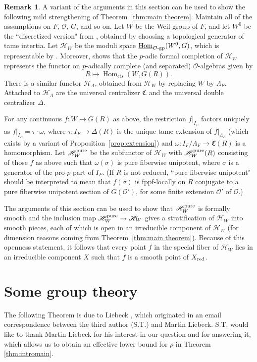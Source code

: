 \documentclass[11pt, letterpaper,english]{amsart}
\theoremstyle{plain}
\theoremstyle{definition}
\newtheorem{remark}[lem]{Remark}
\numberwithin{equation}{section}
\numberwithin{lem}{section}
\newcommand{\fC}{\mathfrak{C}}
\newcommand{\cO}{\mathcal{O}}
\newcommand{\sH}{{\mathscr H}}
\DeclareMathOperator{\Hom}{Hom}
\begin{document}
\begin{remark}\label{remark:dhkm-interpretation}
    A variant of the arguments in this section can be used to show the following mild strengthening of Theorem~\ref{thm:main theorem}. Maintain all of the assumptions on $F$, $\cO$, $G$, and so on. Let $W$ be the Weil group of $F$, and let $W^0$ be the ``discretized version" from \cite{DHKM}, obtained by choosing a topological generator of tame intertia. Let $\sH_W$ be the moduli space $\underline{\Hom}_{\cO\textrm{-}\rm{gp}}(W^0, G)$, which is representable by \cite{DHKM}. Moreover, \cite[Theorem 1.5]{DHKM} shows that the $p$-adic formal completion of $\sH_W$ represents the functor on $p$-adically complete (and separated) $\cO$-algebras given by
    \[
    R \mapsto \Hom_{\mathrm{cts}}(W, G(R)).
    \]
    There is a similar functor $\sH_{\Lambda}$, obtained from $\sH_W$ by replacing $W$ by $\Lambda_F$. Attached to $\sH_{\Lambda}$ are the universal centralizer $\fC$ and the universal double centralizer $\Delta$.

    For any continuous $f: W \to G(R)$ as above, the restriction $f|_{I_F}$ factors uniquely as $f|_{I_F} = \tau \cdot \omega$, where $\tau: I_F \to \Delta(R)$ is the unique tame extension of $f|_{\Lambda_F}$ (which exists by a variant of Proposition~\ref{prop:extension}) and $\omega: I_F/\Lambda_F \to \fC(R)$ is a homomorphism. Let $\sH_W^{\rm{pure}}$ be the subfunctor of $\sH_W$ with $\sH_W^{\rm{pure}}(R)$ consisting of those $f$ as above such that $\omega(\sigma)$ is pure fiberwise unipotent, where $\sigma$ is a generator of the pro-$p$ part of $I_F$. (If $R$ is not reduced, ``pure fiberwise unipotent" should be interpreted to mean that $f(\sigma)$ is fppf-locally on $R$ conjugate to a pure fiberwise unipotent section of $G(\cO')$, for some finite extension $\cO'$ of $\cO$.)
    
    The arguments of this section can be used to show that $\sH_W^{\rm{pure}}$ is formally smooth and the inclusion map $\sH_W^{\rm{pure}} \to \sH_W$ gives a stratification of $\sH_W$ into smooth pieces, each of which is open in an irreducible component of $\sH_W$ (for dimension reasons coming from Theorem~\ref{thm:main theorem}). Because of this openness statement, it follows that every point $f$ in the special fiber of $\sH_W$ lies in an irreducible component $X$ such that $f$ is a smooth point of $X_{\rm{red}}$.
\end{remark}

\appendix

\section{Some group theory}
The following Theorem is due to Liebeck \cite{liebeck}, which originated in an email correspondence between the third author (S.T.) and Martin Liebeck. S.T. would like to thank Martin Liebeck for his interest in our question and for answering it, which allows us to obtain an effective lower bound for $p$ in Theorem \ref{thm:intromain}.
\end{document}
